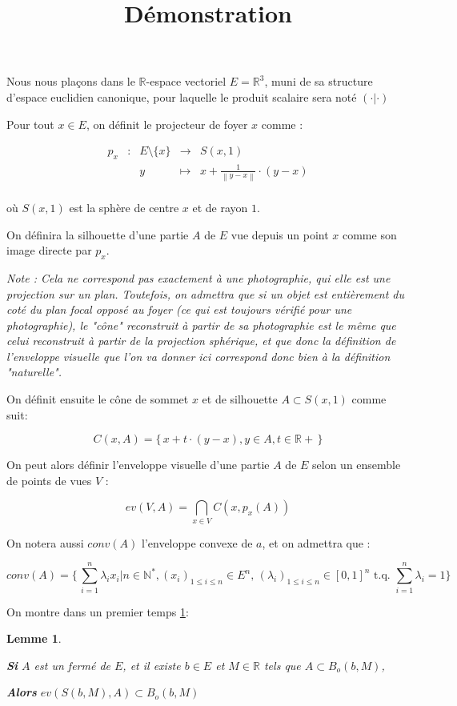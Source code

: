 \documentclass[a4paper]{article}
\title{Démonstration}
\newcommand{\norm}[1]{\left\lVert#1\right\rVert}
\newtheorem{lem}{Lemme}
\begin{document}
Nous nous plaçons dans le $\mathbb{R}$-espace vectoriel $E = \mathbb{R}^{3}$, muni de sa structure d'espace euclidien canonique, pour laquelle le produit scalaire sera noté $(\cdot|\cdot)$


Pour tout $x\in E$, on définit le projecteur de foyer $x$ comme :

\[\begin{array}{ccccl}
p_{x} & : & E\setminus\{x\} & \to & S(x, 1) \\
 & & y & \mapsto & x  + \frac{1}{\norm{y - x}} \cdot (y - x) \\
\end{array}\]

où $S(x, 1)$ est  la sphère de centre $x$ et de rayon $1$.


On définira la silhouette d'une  partie $A$ de $E$ vue depuis un point $x$ comme son image directe par $p_{x}$.

\textit{Note : Cela ne correspond pas exactement à une photographie, qui elle est une projection sur un plan. Toutefois, on admettra que si un objet est entièrement du coté du plan focal opposé au foyer (ce qui est toujours vérifié pour une photographie), le "cône" reconstruit à partir de sa photographie est le même que celui reconstruit à partir de la projection sphérique, et que donc la définition de l'enveloppe visuelle que l'on va donner ici correspond donc bien à la définition "naturelle".}

On définit ensuite le cône de sommet $x$ et de silhouette $A \subset S(x, 1)$ comme suit:

\[C(x,A) = \{\,x + t\cdot{}(y - x), y\in{}A, t\in\mathbb{R}+\,\}\]

On peut alors définir l'enveloppe visuelle d'une partie $A$ de $E$ selon un ensemble de points de vues $V$ :

\[ev(V, A) = \bigcap_{x\in{}V}C(x,p_{x}(A))\]

On notera aussi $conv(A)$ l'enveloppe convexe de $a$, et on admettra que :

\[conv(A) = \{\,\sum_{i=1}^{n} \lambda_{i} x_{i}| n\in{}\mathbb{N}^{*}, (x_{i})_{1\leqslant i \leqslant n} \in E^{n}, \, (\lambda_{i})_{1\leqslant i \leqslant n} \in [0, 1]^{n}\text{ t.q. } \sum_{i=1}^{n} \lambda_{i} = 1\}\]

On montre dans un premier temps \ref{lem1}:

\begin{lem}\label{lem1}

\textbf{Si} $A$ est un fermé de $E$, et il existe $b \in E$ et $M \in \mathbb{R}$ tels que $A \subset B_{o}(b, M)$,

\textbf{Alors} $ev(S(b,M), A) \subset B_{o}(b, M)$

\end{lem}
\end{document}
